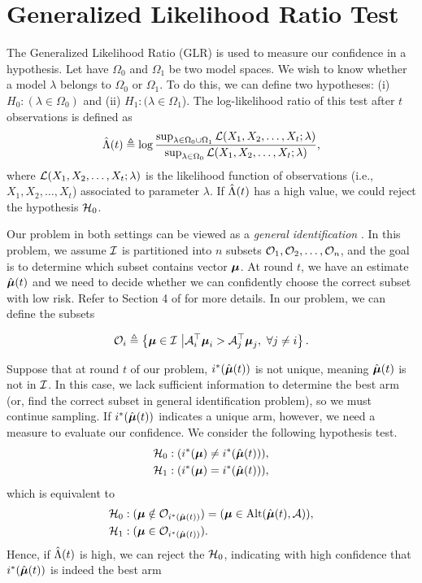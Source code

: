 \section{Generalized Likelihood Ratio Test}\label{apd: GLR}

    The Generalized Likelihood Ratio (GLR) is used to measure our confidence in a hypothesis. Let have $\Omega_0$ and $\Omega_1$ be two model spaces. We wish to know whether a model $\lambda$ belongs to $\Omega_0$ or $\Omega_1$. To do this, we can define two hypotheses: (i) $H_0: (\lambda \in \Omega_0)$ and (ii) $H_1: (\lambda \in \Omega_1$). The log-likelihood ratio of this test after $t$ observations is defined as 
        \begin{equation}\label{eq: def-log-likeli}
              \hat{\Lambda}(t) \triangleq \log \frac{\sup_{\lambda \in \Omega_{0} \cup \Omega_{1}} \mathcal{L}(X_1, X_2, \dots, X_t; \lambda)}{\sup_{\lambda \in \Omega_{0}} \mathcal{L}(X_1, X_2, \dots, X_t; \lambda)},
        \end{equation}
        where $\mathcal{L}(X_1, X_2, \dots, X_t; \lambda)$ is the likelihood function of observations (i.e., $X_1, X_2, \dots, X_t$) associated to parameter $\lambda$. If $\hat{\Lambda}(t)$ has a high value, we could reject the hypothesis $\mathcal{H}_0$.


    Our problem in both settings can be viewed as a \emph{general identification}  \cite{kaufmann2021mixture}. In this problem, we assume $\mathcal{I}$ is partitioned into $n$ subsets $\mathcal{O}_1, \mathcal{O}_2, \ldots, \mathcal{O}_n$, and the goal is to determine which subset contains vector $\boldsymbol{\mu}$. At round $t$, we have an estimate $\hat{\boldsymbol{\mu}}(t)$ and we need to decide whether we can confidently choose the correct subset with low risk. Refer to Section 4 of \cite{kaufmann2021mixture} for more details. In our problem, we can define the subsets    
    
    \begin{align*}
        \mathcal{O}_i \triangleq \left\{ \boldsymbol{\mu} \in \mathcal{I} \ \big| \mathcal{A}_i^\top \boldsymbol{\mu}_i > \mathcal{A}_j^\top \boldsymbol{\mu}_j, \ \forall j \neq i \right\}.
    \end{align*}

    Suppose that at round $t$ of our problem, $i^*(\hat{\boldsymbol{\mu}}(t))$ is not unique, meaning $\hat{\boldsymbol{\mu}}(t)$ is not in $\mathcal{I}$. In this case, we lack sufficient information to determine the best arm (or, find the correct subset in general identification problem), so we must continue sampling. If $i^*(\hat{\boldsymbol{\mu}}(t))$ indicates a unique arm, however, we need a measure to evaluate our confidence. We consider the following hypothesis test.
        \begin{align*}
              &\mathcal{H}_0: (i^*(\boldsymbol{\mu}) \neq i^*(\hat{\boldsymbol{\mu}}(t))),   \\
              &\mathcal{H}_1: (i^*(\boldsymbol{\mu}) = i^*(\hat{\boldsymbol{\mu}}(t))) ,
        \end{align*}
    which is equivalent to
         \begin{align*}
              &\mathcal{H}_0: (\boldsymbol{\mu} \notin \mathcal{O}_{i^*(\hat{\boldsymbol{\mu}}(t))}) =  (\boldsymbol{\mu} \in \text{Alt}(\hat{\boldsymbol{\mu}}(t), \mathcal{A})),  \\
              &\mathcal{H}_1: (\boldsymbol{\mu} \in \mathcal{O}_{i^*(\hat{\boldsymbol{\mu}}(t))}).
        \end{align*}
    Hence, if $\hat{\Lambda}(t)$ is high, we can reject the $\mathcal{H}_0$, indicating with high confidence that \(i^*(\hat{\boldsymbol{\mu}}(t))\) is indeed the best arm
    
